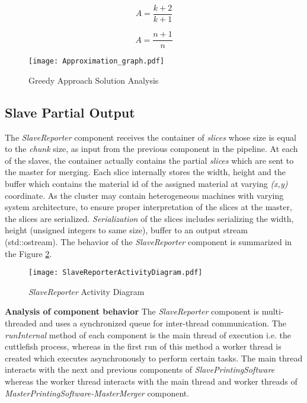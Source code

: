 \begin{equation}
\label{eq:App1}
A = \frac{k+2}{k+1} 
\end{equation}

\begin{equation}
\label{eq:App2}
A =\frac{n+1}{n}
\end{equation}

\begin{figure}[ht!]
\centering
\texttt{[image: Approximation\_graph.pdf]}
\caption{Greedy Approach Solution Analysis}
\label{fig:AppG}
\end{figure}

\subsection{Slave Partial Output} \label{SRepoComp}

The \textit{SlaveReporter} component receives the container of \textit{slices} whose size is equal to the \textit{chunk} size, as input from the previous component in the pipeline. At each of the slaves, the container actually contains the partial \textit{slices} which are sent to the master for merging.  Each slice internally stores the width, height and the buffer which contains the material id of the assigned material at varying \textit{(x,y)} coordinate. As the cluster may contain heterogeneous machines with varying system architecture, to ensure proper interpretation of the slices at the master, the slices are serialized. \textit{Serialization} of the slices includes serializing the width, height (unsigned integers to same size), buffer to an output stream (std::ostream). The behavior of the \textit{SlaveReporter} component is summarized in the Figure \ref{fig:SlaveReporterActivityDiagram}. \newline
\begin{figure}[ht!]
\centering
\texttt{[image: SlaveReporterActivityDiagram.pdf]}
\caption{\textit{SlaveReporter} Activity Diagram}
\label{fig:SlaveReporterActivityDiagram}
\end{figure}

\textbf{Analysis of component behavior}
\newline
The \textit{SlaveReporter} component is multi-threaded and uses a synchronized queue for inter-thread communication. The \textit{runInternal} method of each component is the main thread of execution i.e. the cuttlefish process, whereas in the first run of this method a worker thread is created which executes asynchronously to perform certain tasks. The main thread interacts with the next and previous components of \textit{SlavePrintingSoftware} whereas the worker thread interacts with the main thread and worker threads of \textit{MasterPrintingSoftware-MasterMerger} component. \newline

